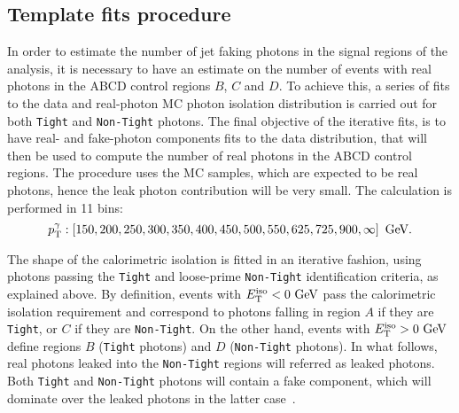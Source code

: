 



\subsection{Template fits procedure}
\label{subsec:bkg:estimation:fits}


In order to estimate the number of jet faking photons in the signal regions of the analysis, it is necessary to have an estimate on the number of events with real photons in the ABCD control regions \(B\), \(C\) and \(D\). To achieve this, a series of fits to the data and real-photon \ac{MC} photon isolation distribution is carried out for both \texttt{Tight} and \texttt{Non-Tight} photons. The final objective of the iterative fits, is to have real- and fake-photon components fits to the data distribution, that will then be used to compute the number of real photons in the ABCD control regions. The procedure uses the \ac{MC} \pythia samples, which are expected to be real photons, hence the leak photon contribution will be very small. The calculation is performed in 11 \ptgam bins:
\[
    p_{\text{T}}^{\gamma}: \left[ 150, 200, 250, 300, 350, 400, 450, 500, 550, 625, 725, 900, \infty \right]~\text{GeV}.
\]


The shape of the calorimetric isolation \etiso is fitted in an iterative fashion, using photons passing the \texttt{Tight} and loose-prime \texttt{Non-Tight} identification criteria, as explained above. 
By definition, events with \(E_{\text{T}}^{\text{iso}}<0~\text{GeV}\) pass the calorimetric isolation requirement and correspond to photons falling in region \(A\) if they are \texttt{Tight}, or \(C\) if they are \texttt{Non-Tight}. On the other hand, events with \(E_{\text{T}}^{\text{iso}}>0~\text{GeV}\) define regions \(B\) (\texttt{Tight} photons) and \(D\) (\texttt{Non-Tight} photons).
In what follows, real photons leaked into the \texttt{Non-Tight} regions will referred as leaked photons. Both \texttt{Tight} and \texttt{Non-Tight} photons will contain a fake component, which will dominate over the leaked photons in the latter case~\cite{ATLAS-DiPhotonSearchIsolation-NOTE,ATLAS-EleMuPhoIsolation-NOTE}.

